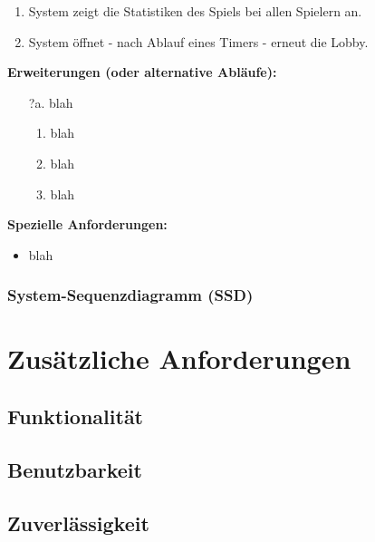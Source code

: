 \documentclass[11pt,ngerman]{article}
\begin{document}
\begin{tcolorbox}
\begin{enumerate}[resume]
                    \item System zeigt die Statistiken des Spiels bei allen Spielern an.
                    \item System öffnet - nach Ablauf eines Timers  - erneut die Lobby.
                \end{enumerate}
                \textbf{Erweiterungen (oder alternative Abläufe):}
                \begin{itemize}
                    \item[?a.] blah
                        \begin{enumerate}
                            \item blah
                            \item blah
                            \item blah
                        \end{enumerate}
                \end{itemize}
                \textbf{Spezielle Anforderungen:}
                 \begin{itemize}
                    \item blah
                \end{itemize}

            \end{tcolorbox}

         \subsubsection{System-Sequenzdiagramm (SSD)}

    \section{Zusätzliche Anforderungen}

    \subsection{Funktionalität}

    \subsection{Benutzbarkeit}

    \subsection{Zuverlässigkeit}
\end{document}
